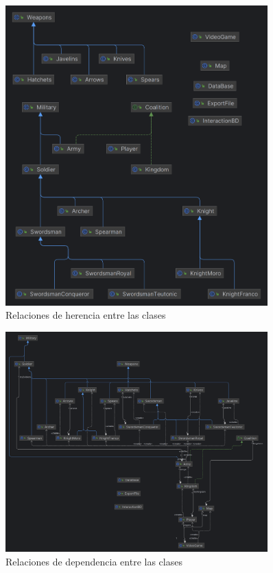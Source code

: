 \documentclass{article}
\begin{document}
    \begin{figure}[H]
        \centering
		\includegraphics[width=0.9\textwidth,keepaspectratio]{img/DiagramaUML1.png}
        \caption{Relaciones de herencia entre las clases}
    \end{figure}
    
    \begin{figure}[H]
        \centering
		\includegraphics[width=0.9\textwidth,keepaspectratio]{img/DiagramaUML2.png}
        \caption{Relaciones de dependencia entre las clases}
    \end{figure}
\end{document}
